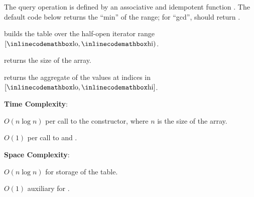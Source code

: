 The query operation is defined by an associative and idempotent function . The default code below returns the ``min'' of the range; for ``gcd'',  should return .

\begin{compactitem}
  \item {} builds the table over the half-open iterator range $[{\inlinecodemath{lo}}, {\inlinecodemath{hi}})$.
  \item {} returns the size of the array.
  \item {} returns the aggregate of the values at indices in $[{\inlinecodemath{lo}}, {\inlinecodemath{hi}}]$.
\end{compactitem}

\textbf{Time Complexity}:
\begin{compactitem}
  \item $O(n \log n)$ per call to the constructor, where $n$ is the size of the array.
  \item $O(1)$ per call to  and .
\end{compactitem}

\textbf{Space Complexity}:
\begin{compactitem}
  \item $O(n \log n)$ for storage of the table.
  \item $O(1)$ auxiliary for .
\end{compactitem}

